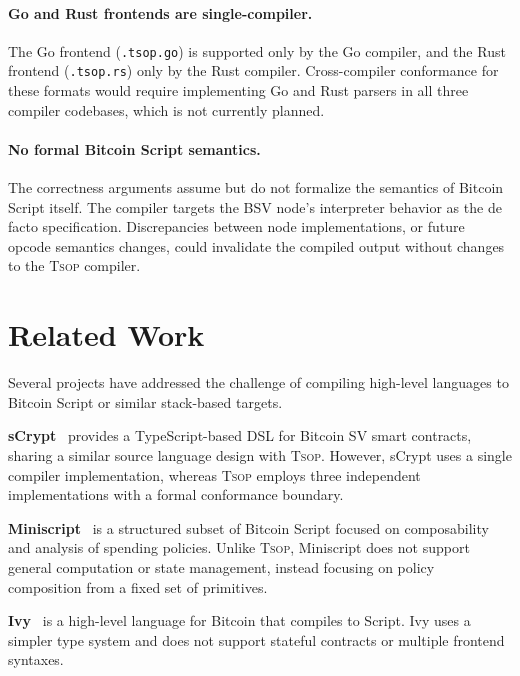 \documentclass[11pt,a4paper]{article}
\newcommand{\tsop}{\textsc{Tsop}}
\begin{document}
\paragraph{Go and Rust frontends are single-compiler.}
The Go frontend (\texttt{.tsop.go}) is supported only by the Go compiler,
and the Rust frontend (\texttt{.tsop.rs}) only by the Rust compiler.
Cross-compiler conformance for these formats would require implementing
Go and Rust parsers in all three compiler codebases, which is not
currently planned.

\paragraph{No formal Bitcoin Script semantics.}
The correctness arguments assume but do not formalize the semantics of
Bitcoin Script itself. The compiler targets the BSV node's interpreter
behavior as the de facto specification. Discrepancies between node
implementations, or future opcode semantics changes, could invalidate
the compiled output without changes to the \tsop{} compiler.

\section{Related Work}
\label{sec:related}

Several projects have addressed the challenge of compiling high-level
languages to Bitcoin Script or similar stack-based targets.

\textbf{sCrypt}~\cite{scrypt} provides a TypeScript-based DSL for Bitcoin SV
smart contracts, sharing a similar source language design with \tsop{}.
However, sCrypt uses a single compiler implementation, whereas \tsop{}
employs three independent implementations with a formal conformance boundary.

\textbf{Miniscript}~\cite{miniscript} is a structured subset of Bitcoin
Script focused on composability and analysis of spending policies. Unlike
\tsop{}, Miniscript does not support general computation or state management,
instead focusing on policy composition from a fixed set of primitives.

\textbf{Ivy}~\cite{ivy} is a high-level language for Bitcoin that compiles
to Script. Ivy uses a simpler type system and does not support stateful
contracts or multiple frontend syntaxes.
\end{document}
